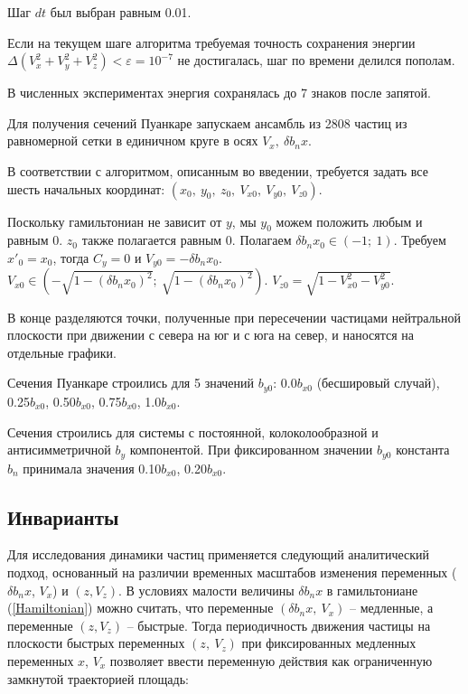 \documentclass[12pt]{article}
\begin{document}
Шаг $dt$ был выбран равным 0.01.

Если на текущем шаге алгоритма требуемая точность сохранения энергии $ \Delta(V^2_x + V^2_y + V^2_z)<\varepsilon=10^{-7}$ не достигалась, шаг по времени делился пополам.

В численных экспериментах энергия сохранялась до 7 знаков после запятой.

Для получения сечений Пуанкаре запускаем ансамбль из 2808 частиц из равномерной сетки в единичном круге в осях $V_x,\ \delta b_n x$. 

В соответствии с алгоритмом, описанным во введении, требуется задать все шесть начальных координат: $(x_0,\ y_0,\ z_0,\ V_{x0},\ V_{y0},\ V_{z0})$.

Поскольку гамильтониан не зависит от $y$, мы $y_0$ можем положить любым и равным 0. $z_0$ также полагается равным 0. Полагаем $\delta b_n x_0 \in (-1;\ 1)$. Требуем $x'_0 = x_0$, тогда $C_y=0$ и $V_{y0} = - \delta b_n x_0$. $V_{x0} \in ( - \sqrt{1 - (\delta b_n x_0)^2 } ;\ \sqrt{1 - (\delta b_n x_0)^2 })$. $V_{z0} = \sqrt{1 - V^2_{x0} - V^2_{y0}}$.

В конце разделяются точки, полученные при пересечении частицами нейтральной плоскости при движении с севера на юг и с юга на север, и наносятся на отдельные графики. 

Сечения Пуанкаре строились для 5 значений $b_{y0}$: 0.0$b_{x0}$ (бесшировый случай), 0.25$b_{x0}$, 0.50$b_{x0}$, 0.75$b_{x0}$, 1.0$b_{x0}$.

Сечения строились для системы с постоянной, колоколообразной и антисимметричной $b_y$ компонентой. При фиксированном значении $b_{y0}$ константа $b_n$ принимала значения 0.10$b_{x0}$, 0.20$b_{x0}$.

\subsection{Инварианты}

Для исследования динамики частиц применяется следующий аналитический подход, основанный на различии временных масштабов изменения переменных ($\delta b_n x$, $V_x$) и $(z, V_z)$.
В условиях малости величины $\delta b_n x$ в гамильтониане (\ref{Hamiltonian}) можно считать, что переменные $(\delta b_n x, \ V_x)$ – медленные, а переменные $(z, V_z)$ – быстрые. Тогда периодичность движения частицы на плоскости быстрых переменных $(z,\ V_z)$ при фиксированных медленных переменных $x$, $V_x$ позволяет ввести переменную действия как ограниченную замкнутой траекторией площадь: 
\end{document}

